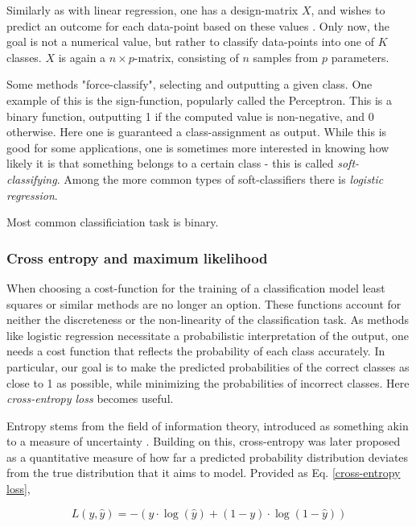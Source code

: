 Similarly as with linear regression, one has a design-matrix $X$, and wishes to predict an outcome for each data-point based on these values \cite[Logistic Regression]{morten}. Only now, the goal is not a numerical value, but rather to classify data-points into one of $K$ classes. $X$ is again a $n\times p$-matrix, consisting of $n$ samples from $p$ parameters.

Some methods "force-classify", selecting and outputting a given class. One example of this is the sign-function, popularly called the Perceptron. This is a binary function, outputting 1 if the computed value is non-negative, and 0 otherwise. Here one is guaranteed a class-assignment as output. 
While this is good for some applications, one is sometimes more interested in knowing how likely it is that something belongs to a certain class - this is called \textit{soft-classifying}. Among the more common types of soft-classifiers there is \textit{logistic regression}. 

Most common classificiation task is binary. 

\subsubsection{Cross entropy and maximum likelihood}\label{sec:cross-entropy}

When choosing a cost-function for the training of a classification model least squares or similar methods are no longer an option. These functions account for neither the discreteness or the non-linearity of the classification task. 
As methods like logistic regression necessitate a probabilistic interpretation of the output, one needs a cost function that reflects the probability of each class accurately. In particular, our goal is to make the predicted probabilities of the correct classes as close to 1 as possible, while minimizing the probabilities of incorrect classes. Here \textit{cross-entropy loss} becomes useful.

Entropy stems from the field of information theory, introduced as something akin to a measure of uncertainty \cite{Shore}. Building on this, cross-entropy was later proposed as a quantitative measure of how far a predicted probability distribution deviates from the true distribution that it aims to model. Provided as Eq. \ref{cross-entropy loss},

\begin{equation}\label{cross-entropy loss}
    L(y, \hat{y}) = - \left( y \cdot \log(\hat{y}) + (1 - y) \cdot \log(1 - \hat{y}) \right)
\end{equation}

